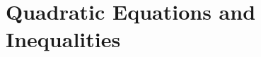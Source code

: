 \documentclass[12pt]{book}
\theoremstyle{definition}
\begin{document}
\chapter{Quadratic Equations and Inequalities}











\end{document}
